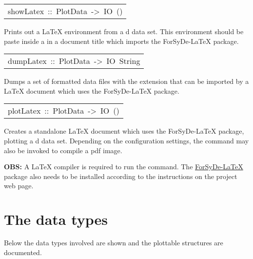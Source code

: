 \begin{haddockdesc}
\item[\begin{tabular}{@{}l}
showLatex\ ::\ PlotData\ ->\ IO\ ()
\end{tabular}]\haddockbegindoc
Prints out a LaTeX environment from a d data set. This
 environment should be paste inside a  in a document
 title which imports the ForSyDe-LaTeX package.\par

\end{haddockdesc}
\begin{haddockdesc}
\item[\begin{tabular}{@{}l}
dumpLatex\ ::\ PlotData\ ->\ IO\ {\char 91}String{\char 93}
\end{tabular}]\haddockbegindoc
Dumps a set of formatted data files with the extension 
 that can be imported by a LaTeX document which uses the
 ForSyDe-LaTeX package.\par

\end{haddockdesc}
\begin{haddockdesc}
\item[\begin{tabular}{@{}l}
plotLatex\ ::\ PlotData\ ->\ IO\ ()
\end{tabular}]\haddockbegindoc
Creates a standalone LaTeX document which uses the ForSyDe-LaTeX
 package, plotting a d data set. Depending on the
 configuration settings, the command  may also be invoked
 to compile a pdf image.\par
\textbf{OBS:} A LaTeX compiler is required to run the 
 command. The \href{https://github.com/forsyde/forsyde-latex}{ForSyDe-LaTeX}
 package also needs to be installed according to the instructions on
 the project web page.\par

\end{haddockdesc}
\section{The data types}
Below the data types involved are shown and the plottable
 structures are documented.\par

